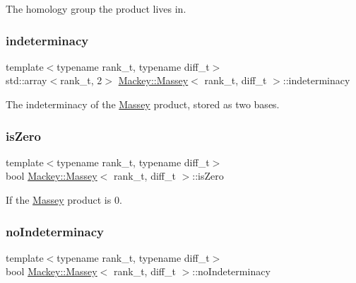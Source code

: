 The homology group the product lives in. 

\mbox{\label{classMackey_1_1Massey_a16f62ab5c5d3960702ae9804a3cbdb1f}} 
\subsubsection{\texorpdfstring{indeterminacy}{indeterminacy}}
{\footnotesize\ttfamily template$<$typename rank\+\_\+t, typename diff\+\_\+t$>$ \\
std\+::array$<$rank\+\_\+t, 2$>$ \hyperlink{classMackey_1_1Massey}{Mackey\+::\+Massey}$<$ rank\+\_\+t, diff\+\_\+t $>$\+::indeterminacy}



The indeterminacy of the \hyperlink{classMackey_1_1Massey}{Massey} product, stored as two bases. 

\mbox{\label{classMackey_1_1Massey_a8e1b4f51835a4de55c6d10e14a607189}} 
\subsubsection{\texorpdfstring{is\+Zero}{isZero}}
{\footnotesize\ttfamily template$<$typename rank\+\_\+t, typename diff\+\_\+t$>$ \\
bool \hyperlink{classMackey_1_1Massey}{Mackey\+::\+Massey}$<$ rank\+\_\+t, diff\+\_\+t $>$\+::is\+Zero}



If the \hyperlink{classMackey_1_1Massey}{Massey} product is 0. 

\mbox{\label{classMackey_1_1Massey_a4dbd74288447b094c8308f4d68bf8cff}} 
\subsubsection{\texorpdfstring{no\+Indeterminacy}{noIndeterminacy}}
{\footnotesize\ttfamily template$<$typename rank\+\_\+t, typename diff\+\_\+t$>$ \\
bool \hyperlink{classMackey_1_1Massey}{Mackey\+::\+Massey}$<$ rank\+\_\+t, diff\+\_\+t $>$\+::no\+Indeterminacy}



